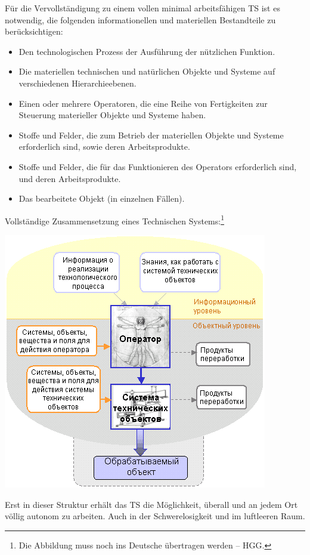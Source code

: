 \documentclass[11pt,a4paper]{article}
\begin{document}
Für die Vervollständigung zu einem vollen minimal arbeitsfähigen TS ist es
notwendig, die folgenden informationellen und materiellen Bestandteile zu
berücksichtigen:
\begin{itemize}\itemsep0pt
\item[1.] Den technologischen Prozess der Ausführung der nützlichen Funktion.
\item[2.] Die materiellen technischen und natürlichen Objekte und Systeme auf
  verschiedenen Hierarchieebenen.
\item[3.] Einen oder mehrere Operatoren, die eine Reihe von Fertigkeiten zur
  Steuerung materieller Objekte und Systeme haben.
\item[4.] Stoffe und Felder, die zum Betrieb der materiellen Objekte und
  Systeme erforderlich sind, sowie deren Arbeitsprodukte.
\item[5.]  Stoffe und Felder, die für das Funktionieren des Operators
  erforderlich sind, und deren Arbeitsprodukte.
\item[6.] Das bearbeitete Objekt (in einzelnen Fällen).
\end{itemize}
Vollständige Zusammensetzung eines Technischen Systems:\footnote{Die Abbildung
  muss noch ins Deutsche übertragen werden -- HGG.}
\begin{center}
 \includegraphics[width=.8\textwidth]{mts-3.png}
\end{center}
Erst in dieser Struktur erhält das TS die Möglichkeit, überall und an jedem
Ort völlig autonom zu arbeiten. Auch in der Schwerelosigkeit und im luftleeren
Raum.
\end{document}
